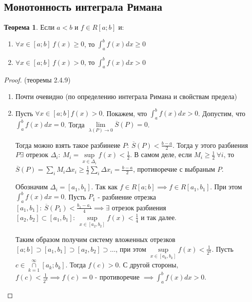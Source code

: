 \documentclass{report}
\theoremstyle{definition}
\newtheorem{theorem}{Теорема}[section]
\begin{document}
\subsection{Монотонность интеграла Римана}

\begin{theorem}
  Если $a<b$ и $f\in R[a;b]$ и:
  \begin{enumerate}
    \item $\forall x \in [a;b] \ f(x) \geqslant 0$, то $\int_{a}^{b} f(x) dx \geqslant 0$
    \item $\forall x \in [a;b] \ f(x) > 0$, то $\int_{a}^{b}f(x)dx > 0$
  \end{enumerate}
\end{theorem}

\begin{proof}
  (теоремы 2.4.9)

  \begin{enumerate}
    \item Почти очевидно (по определению интеграла Римана и свойствам предела)
    \item Пусть $\forall x \in [a;b] f(x) > 0$. Покажем, что $\int_{a}^{b} f(x) dx > 0$. Допустим, что
          $\int_{a}^{b}f(x) dx = 0$. Тогда $\underset{\lambda(P)\rightarrow0}{\lim}\overline{S}(P)=0$.

          Тогда можно взять такое разбинеие $P: \ \overline{S}(P) < \frac{b-a}{2}$. Тогда у этого разбиения $P
            \exists$ отрезок $\Delta_{i}: \ M_{i} = \underset{x \in \Delta_{i}}{\sup}f(x) < \frac{1}{2}$. В самом деле,
          если $M_{i} \geqslant \frac{1}{2} \ \forall i$, то $\overline{S}(P) = \underset{i}{\sum}M_{i}\Delta x_{i}
            \geqslant \frac{1}{2}\underset{i}{\sum}\Delta x_{i} = \frac{b-a}{2}$, противоречие с выбраным $P$.

          Обозначим $\Delta_{i} = [a_{1},b_{1}]$. Так как $f\in R[a;b] \implies f\in R[a_{1},b_{1}]$. При этом
          $\int_{a}^{b}f(x)dx = 0$. Пусть $P_{1}$ - разбиение отрезка $[a_{1},b_{1}]: \ \overline{S}(P_{1}) <
            \frac{b_{1} - a_{1}}{4} \implies \exists$ отрезок разбиения $[a_{2},b_{2}] \subset [a_{1},b_{1}]: \
            \underset{x\in [a_{2},b_{2}]}{\sup}f(x) < \frac{1}{4}$ и так далее.

          Таким образом получим систему вложенных отрезков $[a;b] \supset [a_{1},b_{1}] \supset [a_{2},b_{2}] \supset
            \ldots$, при этом $\underset{x\in[a_{k},b_{k}]}{\sup}f(x) < \frac{1}{2^{k}}$. Пусть $c \in \underset
            {k=1}{\overset{\infty}{\cap}}[a_{k};b_{k}]$. Тогда $f(c) > 0$. С другой стороны, $f(c) < \frac{1}{2^{k}}
            \implies f(c) = 0$ - противоречие $\implies \int_{a}^{b}f(x)dx > 0$.
  \end{enumerate}
\end{proof}
\end{document}
